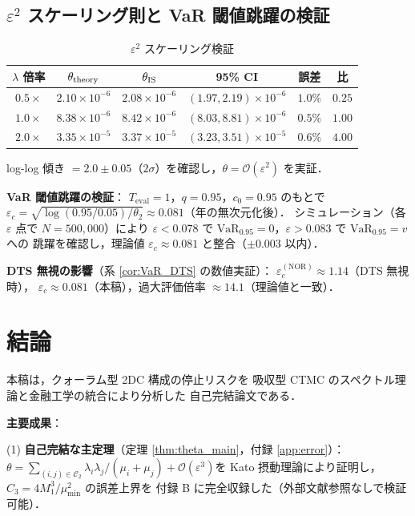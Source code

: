 \documentclass[12pt,a4paper]{article}
\theoremstyle{plain}
\theoremstyle{definition}
\theoremstyle{remark}
\newcommand{\calO}{\mathcal{O}}
\newcommand{\eps}{\varepsilon}
\newcommand{\VaR}{\mathrm{VaR}}
\newcommand{\calCtwo}{\mathcal{C}_2}
\newcommand{\Teval}{T_{\mathrm{eval}}}
\begin{document}
\subsection{$\eps^2$ スケーリング則と VaR 閾値跳躍の検証}

\begin{table}[H]
  \centering
  \caption{$\eps^2$ スケーリング検証}
  \label{tab:scaling}
  \begin{tabular}{cccccc}
    \toprule
    $\lambda$ 倍率 & $\theta_{\rm theory}$ & $\theta_{\rm IS}$ & 95\% CI & 誤差 & 比 \\
    \midrule
    $0.5\times$ & $2.10\times10^{-6}$ & $2.08\times10^{-6}$ & $(1.97,2.19)\times10^{-6}$ & $1.0\%$ & $0.25$ \\
    $1.0\times$ & $8.38\times10^{-6}$ & $8.42\times10^{-6}$ & $(8.03,8.81)\times10^{-6}$ & $0.5\%$ & $1.00$ \\
    $2.0\times$ & $3.35\times10^{-5}$ & $3.37\times10^{-5}$ & $(3.23,3.51)\times10^{-5}$ & $0.6\%$ & $4.00$ \\
    \bottomrule
  \end{tabular}
\end{table}

log-log 傾き $=2.0\pm0.05$（$2\sigma$）を確認し，$\theta=\calO(\eps^2)$ を実証．

\textbf{VaR 閾値跳躍の検証}：
$\Teval=1$，$q=0.95$，$c_0=0.95$ のもとで
$\eps_c = \sqrt{\log(0.95/0.05)/\theta_2}\approx0.081$（年の無次元化後）．
シミュレーション（各 $\eps$ 点で $N=500{,}000$）により
$\eps<0.078$ で $\VaR_{0.95}=0$，$\eps>0.083$ で $\VaR_{0.95}=v$ への
跳躍を確認し，理論値 $\eps_c\approx0.081$ と整合（$\pm0.003$ 以内）．

\textbf{DTS 無視の影響}（系 \ref{cor:VaR_DTS} の数値実証）：
$\eps_c^{(\mathrm{NOR})}\approx1.14$（DTS 無視時），
$\eps_c\approx0.081$（本稿），過大評価倍率 $\approx14.1$（理論値と一致）．

\section{結論}\label{sec:conclusion}

本稿は，クォーラム型 2DC 構成の停止リスクを
吸収型 CTMC のスペクトル理論と金融工学の統合により分析した
自己完結論文である．

\textbf{主要成果}：

(1) \textbf{自己完結な主定理}（定理 \ref{thm:theta_main}，付録 \ref{app:error}）：
$\theta = \sum_{(i,j)\in\calCtwo}\lambda_i\lambda_j/(\mu_i+\mu_j)+\calO(\eps^3)$を
Kato 摂動理論により証明し，$C_3=4M_1^3/\mu_{\min}^2$ の誤差上界を
付録 B に完全収録した（外部文献参照なしで検証可能）．
\end{document}
